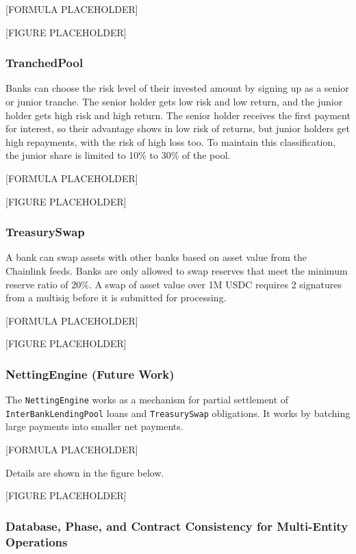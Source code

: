 \documentclass[12pt,a4paper]{report}
\begin{document}
[FORMULA PLACEHOLDER]

[FIGURE PLACEHOLDER]

\subsubsection{TranchedPool}
\label{sec:tranched-pools}

Banks can choose the risk level of their invested amount by signing up as a senior or junior tranche. The senior holder gets low risk and low return, and the junior holder gets high risk and high return. The senior holder receives the first payment for interest, so their advantage shows in low risk of returns, but junior holders get high repayments, with the risk of high loss too. To maintain this classification, the junior share is limited to 10\% to 30\% of the pool.

[FORMULA PLACEHOLDER]

[FIGURE PLACEHOLDER]

\subsubsection{TreasurySwap}
\label{sec:treasury-fx}

A bank can swap assets with other banks based on asset value from the Chainlink feeds. Banks are only allowed to swap reserves that meet the minimum reserve ratio of 20\%. A swap of asset value over 1M USDC requires 2 signatures from a multisig before it is submitted for processing.

[FORMULA PLACEHOLDER]

[FIGURE PLACEHOLDER]

\subsubsection{NettingEngine (Future Work)}
\label{sec:netting-settlement}

The \texttt{NettingEngine} works as a mechanism for partial settlement of \texttt{InterBankLendingPool} loans and \texttt{TreasurySwap} obligations. It works by batching large payments into smaller net payments.

[FORMULA PLACEHOLDER]

Details are shown in the figure below.

[FIGURE PLACEHOLDER]

\subsubsection{Database, Phase, and Contract Consistency for Multi-Entity Operations}
\label{sec:multi-entity-consistency}
\end{document}
